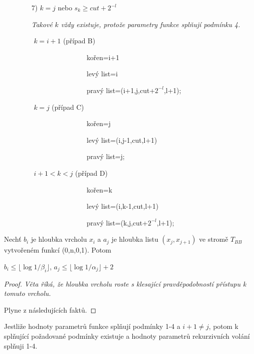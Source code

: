 \ \ \ \ \ \ \ \ 7) $k = j$ nebo $s_{k} \geq cut + 2^{-l}$

\ \ \ \ \ \ \ \ \emph{Takové $k$ vždy existuje, protože parametry funkce splňují podmínku 4.}

\ \ \ \ \ \ \ \  $k = i + 1$ (případ B) 

\ \ \ \ \ \ \ \ \ \ \ \ \ \ \ \ \ \ \ \ \ \ \ \ kořen=i+1

\ \ \ \ \ \ \ \ \ \ \ \ \ \ \ \ \ \ \ \ \ \ \ \ levý list=i

\ \ \ \ \ \ \ \ \ \ \ \ \ \ \ \ \ \ \ \ \ \ \ \ pravý list=(i+1,j,cut+$2^{-l}$,l+1);

\ \ \ \ \ \ \ \  $k = j$ (případ C)  

\ \ \ \ \ \ \ \ \ \ \ \ \ \ \ \ \ \ \ \ \ \ \ \ kořen=j

\ \ \ \ \ \ \ \ \ \ \ \ \ \ \ \ \ \ \ \ \ \ \ \ levý list=(i,j-1,cut,l+1)
	
\ \ \ \ \ \ \ \ \ \ \ \ \ \ \ \ \ \ \ \ \ \ \ \ pravý list=j;

\ \ \ \ \ \ \ \  $i + 1 < k < j$ (případ D) 

\ \ \ \ \ \ \ \ \ \ \ \ \ \ \ \ \ \ \ \ \ \ \ \ kořen=k

\ \ \ \ \ \ \ \ \ \ \ \ \ \ \ \ \ \ \ \ \ \ \ \ levý list=(i,k-1,cut,l+1)
	
\ \ \ \ \ \ \ \ \ \ \ \ \ \ \ \ \ \ \ \ \ \ \ \ pravý list=(k,j,cut+$2^{-l}$,l+1);



\begin{theorem}
Nechť $b_i$ je hloubka vrcholu $x_i$ a $a_j$ je hloubka listu $(x_j,x_{j+1})$ ve stromě $T_{BB}$ vytvořeném funkcí 
(0,n,0,1). Potom

$b_i \leq \lfloor \log{1/\beta_i}\rfloor$, $a_j \leq \lfloor \log{1/\alpha_j}\rfloor + 2$ 
\end{theorem}

\begin{proof}
\emph{Věta říká, že hloubka vrcholu roste s klesající pravděpodobností přístupu k tomuto vrcholu.}

Plyne z následujících faktů.
\end{proof}

\begin{fakt}
Jestliže hodnoty parametrů funkce  splňují 
podmínky 1-4 a $i + 1 \neq j$, potom k splňující požadované podmínky existuje 
a hodnoty parametrů rekurzivních volání  splňuji 1-4.
\end{fakt}


